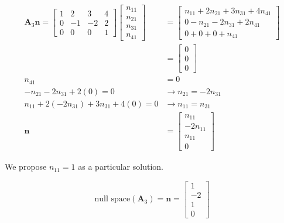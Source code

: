 \begin{itemize}
\begin{align*}
\mathbf{A}_3 \mathbf{n} =    \begin{bmatrix}
                                        1 & 2 & 3 & 4\\
                                        0 & -1 & -2 & 2\\
                                        0 & 0 & 0 & 1
                                    \end{bmatrix}
                                    \begin{bmatrix}
                                    n_{11} \\ n_{21} \\ n_{31} \\ n_{41}
                                    \end{bmatrix}
                                    &= \begin{bmatrix}
        n_{11} + 2 n_{21} + 3 n_{31} + 4 n_{41}\\
        0 - n_{21} - 2 n_{31} + 2 n_{41}\\
        0 + 0 + 0 +  n_{41}
       \end{bmatrix}\\
    &= \begin{bmatrix}
       0 \\ 0 \\ 0
      \end{bmatrix}\\
n_{41} &= 0\\
- n_{21} - 2 n_{31} + 2 (0) = 0
    & \rightarrow n_{21} = - 2 n_{31} \\
n_{11} + 2 (-2n_{31}) + 3 n_{31} + 4 (0) = 0
    & \rightarrow n_{11} = n_{31}\\
     \mathbf{n} &= \begin{bmatrix}
                 n_{11}\\
                 -2 n_{11}\\
                 n_{11}\\
                 0
                \end{bmatrix}
\end{align*}

We propose $n_{11} = 1$ as a particular solution.

\begin{equation*}
  \text{null space}(\mathbf{A}_3) = \mathbf{n} = \begin{bmatrix}
                 1\\
                 -2\\
                 1\\
                 0
                \end{bmatrix}
\end{equation*}




\end{itemize}



